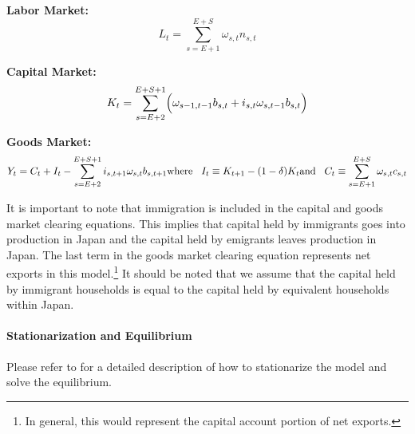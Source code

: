 \documentclass[10pt]{article}
\renewcommand{\thesection}{\arabic{section}}
\renewcommand{\thesubsection}{\thesection.\arabic{subsection}}
\renewcommand{\thesubsubsection}{\thesubsection.\arabic{subsubsection}}
\numberwithin{equation}{subsection}
\renewcommand{\subsubsection}[2][]{\oldsubsubsection[#1]{#2}\index{#1}\label{sec:\thesubsubsection}}
\begin{document}
\begin{appendices}
\textbf{Labor Market:}
\begin{equation}
   L_t = \sum_{s=E+1}^{E+S}\omega_{s,t}n_{s,t}
\end{equation}

\textbf{Capital Market:}
\begin{equation}
   K_t = \sum_{s=E+2}^{E+S+1}\Bigl(\omega_{s-1,t-1}b_{s,t}+i_{s,t}\omega_{s,t-1}b_{s,t}\Bigr)
\end{equation}

\textbf{Goods Market:}
\begin{dmath}
   Y_t = C_t + I_t - \sum_{s=E+2}^{E+S+1}i_{s,t+1}\omega_{s,t}b_{s,t+1} \\
   {\text{where} \hspace{3mm} I_t \equiv K_{t+1} - (1-\delta)K_t} \\
   {\text{and} \hspace{3mm} C_t \equiv \sum_{s=E+1}^{E+S}\omega_{s,t}c_{s,t}}
\end{dmath}

\par It is important to note that immigration is included in the capital and goods market clearing equations. This implies that capital held by immigrants goes into production in Japan and the capital held by emigrants leaves production in Japan. The last term in the goods market clearing equation represents net exports in this model.\footnote{In general, this would represent the capital account portion of net exports.} It should be noted that we assume that the capital held by immigrant households is equal to the capital held by equivalent households within Japan.


\paragraph{Stationarization and Equilibrium}

Please refer to \cite{E2020} for a detailed description of how to stationarize the model and solve the equilibrium.



\end{appendices}
\end{document}
